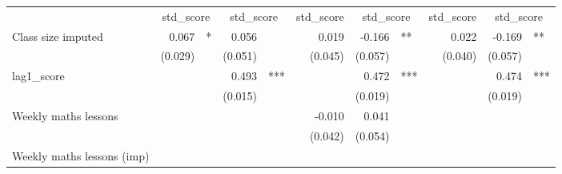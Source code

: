 \documentclass{article}
\begin{document}
\begin{table}[!h]
\centering
\begin{tabular}{lllllllllll}
\cline{1-11}
\multicolumn{1}{r}{} &
  \multicolumn{2}{c}{std\_score} &
  \multicolumn{2}{c}{std\_score} &
  \multicolumn{1}{c}{std\_score} &
  \multicolumn{2}{c}{std\_score} &
  \multicolumn{1}{c}{std\_score} &
  \multicolumn{2}{c}{std\_score} \\
\cline{1-11}
\multicolumn{1}{l}{Class size imputed} &
  \multicolumn{1}{r}{0.067} &
  \multicolumn{1}{l}{*} &
  \multicolumn{1}{r}{0.056} &
  \multicolumn{1}{l}{} &
  \multicolumn{1}{r}{0.019} &
  \multicolumn{1}{r}{-0.166} &
  \multicolumn{1}{l}{**} &
  \multicolumn{1}{r}{0.022} &
  \multicolumn{1}{r}{-0.169} &
  \multicolumn{1}{l}{**} \\
\multicolumn{1}{l}{} &
  \multicolumn{1}{r}{(0.029)} &
  \multicolumn{1}{l}{} &
  \multicolumn{1}{r}{(0.051)} &
  \multicolumn{1}{l}{} &
  \multicolumn{1}{r}{(0.045)} &
  \multicolumn{1}{r}{(0.057)} &
  \multicolumn{1}{l}{} &
  \multicolumn{1}{r}{(0.040)} &
  \multicolumn{1}{r}{(0.057)} &
  \multicolumn{1}{l}{} \\
\multicolumn{1}{l}{lag1\_score} &
  \multicolumn{1}{r}{} &
  \multicolumn{1}{l}{} &
  \multicolumn{1}{r}{0.493} &
  \multicolumn{1}{l}{***} &
  \multicolumn{1}{r}{} &
  \multicolumn{1}{r}{0.472} &
  \multicolumn{1}{l}{***} &
  \multicolumn{1}{r}{} &
  \multicolumn{1}{r}{0.474} &
  \multicolumn{1}{l}{***} \\
\multicolumn{1}{l}{} &
  \multicolumn{1}{r}{} &
  \multicolumn{1}{l}{} &
  \multicolumn{1}{r}{(0.015)} &
  \multicolumn{1}{l}{} &
  \multicolumn{1}{r}{} &
  \multicolumn{1}{r}{(0.019)} &
  \multicolumn{1}{l}{} &
  \multicolumn{1}{r}{} &
  \multicolumn{1}{r}{(0.019)} &
  \multicolumn{1}{l}{} \\
\multicolumn{1}{l}{Weekly maths lessons} &
  \multicolumn{1}{r}{} &
  \multicolumn{1}{l}{} &
  \multicolumn{1}{r}{} &
  \multicolumn{1}{l}{} &
  \multicolumn{1}{r}{-0.010} &
  \multicolumn{1}{r}{0.041} &
  \multicolumn{1}{l}{} &
  \multicolumn{1}{r}{} &
  \multicolumn{1}{r}{} &
  \multicolumn{1}{l}{} \\
\multicolumn{1}{l}{} &
  \multicolumn{1}{r}{} &
  \multicolumn{1}{l}{} &
  \multicolumn{1}{r}{} &
  \multicolumn{1}{l}{} &
  \multicolumn{1}{r}{(0.042)} &
  \multicolumn{1}{r}{(0.054)} &
  \multicolumn{1}{l}{} &
  \multicolumn{1}{r}{} &
  \multicolumn{1}{r}{} &
  \multicolumn{1}{l}{} \\
\multicolumn{1}{l}{Weekly maths lessons (imp)} &
  \multicolumn{1}{r}{} &
  \multicolumn{1}{l}{} &

\end{tabular}
\end{table}
\end{document}
